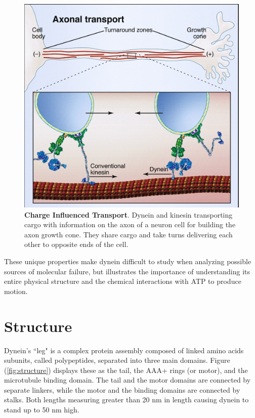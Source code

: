 \begin{figure}[H]
	\centering
	\includegraphics[width=0.6\columnwidth]{Figures/retrograde_transport.jpg}
	\caption[Charge Influenced Transport]{\textbf{Charge Influenced Transport}. Dynein and kinesin transporting cargo with information on the axon of a neuron cell for building the axon growth cone. They share cargo and take turns delivering each other to opposite ends of the cell. \cite{Vale2003molecular}}
	\label{fig:transport}
\end{figure}

These unique properties make dynein difficult to study when analyzing possible sources of molecular failure, but illustrates the importance of understanding its entire physical structure and the chemical interactions with ATP to produce motion.

\newpage
\section{Structure}

Dynein's ``leg" is a complex protein assembly composed of linked amino acids subunits, called polypeptides, separated into three main domains. Figure (\ref{fig:structure}) displays these as the tail, the AAA+ rings (or motor), and the microtubule binding domain. The tail and the motor domains are connected by separate linkers, while the motor and the binding domains are connected by stalks. Both lengths measuring greater than 20 nm in length causing dynein to stand up to 50 nm high. 

